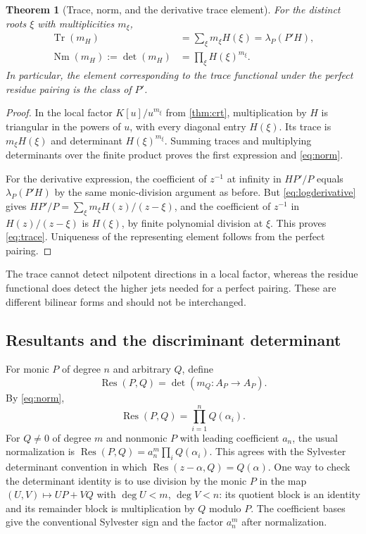 \documentclass[11pt,letterpaper]{article}
\numberwithin{equation}{section}
\newtheorem{theorem}{Theorem}[section]
\theoremstyle{definition}
\theoremstyle{remark}\newtheorem{remark}[theorem]{Remark}
\newcommand{\Res}{\operatorname{Res}}
\newcommand{\Tr}{\operatorname{Tr}}
\newcommand{\Nm}{\operatorname{Nm}}
\begin{document}
\begin{theorem}[Trace, norm, and the derivative trace element]
\label{thm:traceresidue}
For the distinct roots $\xi$ with multiplicities $m_\xi$,
\begin{align}
 \Tr(m_H)&=\sum_\xi m_\xi H(\xi)
          =\lambda_P(P'H),\label{eq:trace}\\
 \Nm(m_H):=\det(m_H)&=\prod_\xi H(\xi)^{m_\xi}.\label{eq:norm}
\end{align}
In particular, the element corresponding to the trace functional under
the perfect residue pairing is the class of $P'$.
\end{theorem}
\begin{proof}
In the local factor $K[u]/u^{m_\xi}$ from \cref{thm:crt}, multiplication
by $H$ is triangular in the powers of $u$, with every diagonal entry
$H(\xi)$. Its trace is $m_\xi H(\xi)$ and determinant
$H(\xi)^{m_\xi}$. Summing traces and multiplying determinants over
the finite product proves the first expression and \eqref{eq:norm}.

For the derivative expression, the coefficient of $z^{-1}$ at infinity
in $HP'/P$ equals $\lambda_P(P'H)$ by the same monic-division argument
as before. But \eqref{eq:logderivative} gives
$HP'/P=\sum_\xi m_\xi H(z)/(z-\xi)$, and the coefficient of $z^{-1}$
in $H(z)/(z-\xi)$ is $H(\xi)$, by finite polynomial division at
$\xi$. This proves \eqref{eq:trace}. Uniqueness of the representing
element follows from the perfect pairing.
\end{proof}
The trace cannot detect nilpotent directions in a local factor,
whereas the residue functional does detect the higher jets needed
for a perfect pairing. These are different bilinear forms and should
not be interchanged.

\subsection{Resultants and the discriminant determinant}
For monic $P$ of degree $n$ and arbitrary $Q$, define
\[
 \Res(P,Q)=\det(m_Q:A_P\to A_P).
\]
By \eqref{eq:norm},
\begin{equation}\label{eq:resultantproduct}
 \Res(P,Q)=\prod_{i=1}^nQ(\alpha_i).
\end{equation}
For $Q\ne0$ of degree $m$ and nonmonic $P$ with leading coefficient
$a_n$, the usual normalization is
$\Res(P,Q)=a_n^m\prod_iQ(\alpha_i)$. This agrees with the Sylvester
determinant convention in which $\Res(z-\alpha,Q)=Q(\alpha)$.
One way to check the determinant identity is to use division by the
monic $P$ in the map $(U,V)\mapsto UP+VQ$ with
$\deg U<m$, $\deg V<n$: its quotient block is an identity and its
remainder block is multiplication by $Q$ modulo $P$. The coefficient
bases give the conventional Sylvester sign and the factor $a_n^m$
after normalization.
\end{document}
